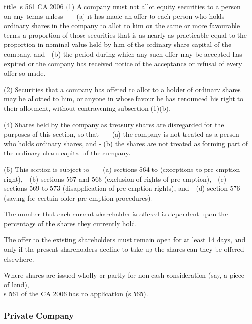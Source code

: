 \documentclass[
]{article}
\newenvironment{Shaded}{}{}
\newcommand{\NormalTok}[1]{#1}
\begin{document}
\begin{Shaded}
\begin{Highlighting}[]
\NormalTok{title: s 561 CA 2006}
\NormalTok{(1) A company must not allot equity securities to a person on any terms unless—}
\NormalTok{{-} (a) it has made an offer to each person who holds ordinary shares in the company to allot to him on the same or more favourable terms a proportion of those securities that is as nearly as practicable equal to the proportion in nominal value held by him of the ordinary share capital of the company, and}
\NormalTok{{-} (b) the period during which any such offer may be accepted has expired or the company has received notice of the acceptance or refusal of every offer so made.}

\NormalTok{(2) Securities that a company has offered to allot to a holder of ordinary shares may be allotted to him, or anyone in whose favour he has renounced his right to their allotment, without contravening subsection (1)(b).}

\NormalTok{(4) Shares held by the company as treasury shares are disregarded for the purposes of this section, so that—}
\NormalTok{{-} (a) the company is not treated as a person who holds ordinary shares, and}
\NormalTok{{-} (b) the shares are not treated as forming part of the ordinary share capital of the company.}

\NormalTok{(5) This section is subject to—}
\NormalTok{{-} (a) sections 564 to (exceptions to pre{-}emption right),}
\NormalTok{{-} (b) sections 567 and 568 (exclusion of rights of pre{-}emption),}
\NormalTok{{-} (c) sections 569 to 573 (disapplication of pre{-}emption rights), and}
\NormalTok{{-} (d) section 576 (saving for certain older pre{-}emption procedures).}
\end{Highlighting}
\end{Shaded}

The number that each current shareholder is offered is dependent upon
the percentage of the shares they currently hold.

The offer to the existing shareholders must remain open for at least 14
days, and only if the present shareholders decline to take up the shares
can they be offered elsewhere.

Where shares are issued wholly or partly for non-cash consideration
(say, a piece of land),\\
s 561 of the CA 2006 has no application (s 565).

\hypertarget{private-company}{%
\subsubsection{Private Company}\label{private-company}}
\end{document}
